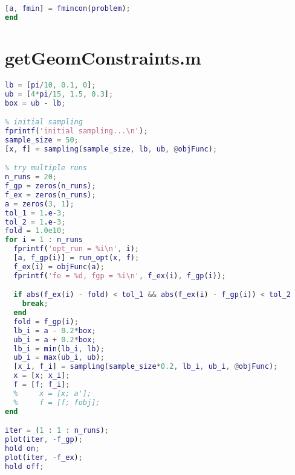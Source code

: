 \documentclass[a4paper]{article}
\begin{document}
\begin{appendices}
\begin{lstlisting}[language=Matlab]
% run fmincon
[a, fmin] = fmincon(problem);
end
\end{lstlisting}

\section{getGeomConstraints.m}\label{app:multirun}
\begin{lstlisting}[language=Matlab]
% lower and upper bounds
lb = [pi/10, 0.1, 0];
ub = [4*pi/15, 1.5, 0.3];
box = ub - lb;

% initial sampling
fprintf('initial sampling...\n');
sample_size = 50;
[x, f] = sampling(sample_size, lb, ub, @objFunc);

% try multiple runs
n_runs = 20;
f_gp = zeros(n_runs);
f_ex = zeros(n_runs);
a = zeros(3, 1);
tol_1 = 1.e-3;
tol_2 = 1.e-3;
fold = 1.0e10;
for i = 1 : n_runs
  fprintf('opt_run = %i\n', i);
  [a, f_gp(i)] = run_opt(x, f);
  f_ex(i) = objFunc(a);
  fprintf('fe = %d, fgp = %i\n', f_ex(i), f_gp(i));

  if abs(f_ex(i) - fold) < tol_1 && abs(f_ex(i) - f_gp(i)) < tol_2
    break;
  end
  fold = f_gp(i);
  lb_i = a - 0.2*box;
  ub_i = a + 0.2*box;
  lb_i = min(lb_i, lb);
  ub_i = max(ub_i, ub);
  [x_i, f_i] = sampling(sample_size*0.2, lb_i, ub_i, @objFunc);  
  x = [x; x_i];
  f = [f; f_i];
  %     x = [x; a'];
  %     f = [f; fobj];
end

iter = (1 : 1 : n_runs);
plot(iter, -f_gp);
hold on;
plot(iter, -f_ex);
hold off;
\end{lstlisting}


\end{appendices}
\end{document}
